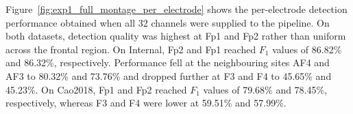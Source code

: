 Figure~\ref{fig:exp1_full_montage_per_electrode} shows the per-electrode detection performance obtained when all 32 channels were supplied to the pipeline. On both datasets, detection quality was highest at Fp1 and Fp2 rather than uniform across the frontal region. On Internal, Fp2 and Fp1 reached $F_1$ values of 86.82\% and 86.32\%, respectively. Performance fell at the neighbouring sites AF4 and AF3 to 80.32\% and 73.76\% and dropped further at F3 and F4 to 45.65\% and 45.23\%. On Cao2018, Fp1 and Fp2 reached $F_1$ values of 79.68\% and 78.45\%, respectively, whereas F3 and F4 were lower at 59.51\% and 57.99\%.

